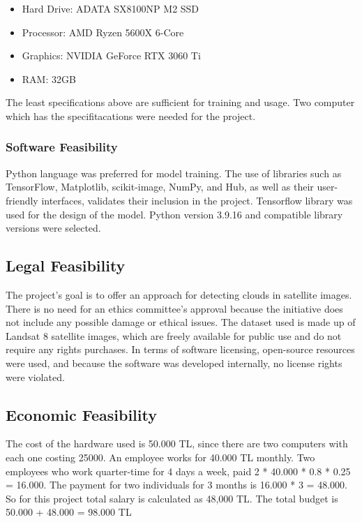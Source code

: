 \begin{itemize}
    \item  Hard Drive: ADATA SX8100NP M2 SSD
    \item  Processor: AMD Ryzen 5600X 6-Core
    \item  Graphics: NVIDIA GeForce RTX 3060 Ti
    \item  RAM: 32GB
\end{itemize}

The least specifications above are sufficient for training and usage. Two computer which has the specifitacations were needed for the project.

\subsubsection{Software Feasibility}

Python language was preferred for model training. The use of libraries such as TensorFlow, Matplotlib, scikit-image, NumPy, and Hub, as well as their user-friendly interfaces, validates their inclusion in the project. Tensorflow library was used for the design of the model. Python version 3.9.16 and compatible library versions were selected.

\subsection{Legal Feasibility}

The project's goal is to offer an approach for detecting clouds in satellite images. There is no need for an ethics committee's approval because the initiative does not include any possible damage or ethical issues. The dataset used is made up of Landsat 8 satellite images, which are freely available for public use and do not require any rights purchases. In terms of software licensing, open-source resources were used, and because the software was developed internally, no license rights were violated.
\hfill \break
\hfill \break
\subsection{Economic Feasibility}

The cost of the hardware used is 50.000 TL, since there are two computers with each one costing 25000. An employee works for 40.000 TL monthly. Two employees who work quarter-time for 4 days a week, paid 2 * 40.000 * 0.8 * 0.25 = 16.000. The payment for two individuals for 3 months is 16.000 * 3 = 48.000. So for this project total salary is calculated as 48,000 TL. The total budget is 50.000 + 48.000 = 98.000 TL

